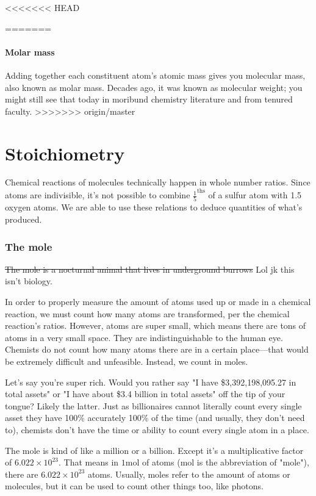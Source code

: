 \documentclass[letterpaper, 12pt]{article}
\begin{document}
<<<<<<< HEAD
	
	
=======

	\subsection{Molar mass}
	Adding together each constituent atom's atomic mass gives you molecular mass, also known as molar mass. Decades ago, it was known as molecular weight; you might still see that today in moribund chemistry literature and from tenured faculty.
>>>>>>> origin/master

\clearpage

\part{Stoichiometry}
Chemical reactions of molecules technically happen in whole number ratios. Since atoms are indivisible, it's not possible to combine $\frac{1}{5}^{\text{ths}}$ of a sulfur atom with 1.5 oxygen atoms. We are able to use these relations to deduce quantities of what's produced.

\section{The mole}
\st{The mole is a nocturnal animal that lives in underground burrows} Lol jk this isn't biology.

In order to properly measure the amount of atoms used up or made in a chemical reaction, we must count how many atoms are transformed, per the chemical reaction's ratios. However, atoms are super small, which means there are tons of atoms in a very small space. They are indistinguishable to the human eye. Chemists do not count how many atoms there are in a certain place---that would be extremely difficult and unfeasible. Instead, we count in moles.

Let's say you're super rich. Would you rather say "I have \$3,392,198,095.27 in total assets" or "I have about \$3.4 billion in total assets" off the tip of your tongue? Likely the latter. Just as billionaires cannot literally count every single asset they have 100\% accurately 100\% of the time (and usually, they don't need to), chemists don't have the time or ability to count every single atom in a place.

The mole is kind of like a million or a billion. Except it's a multiplicative factor of $6.022 \times 10^{23}$. That means in $1 \text{mol}$ of atoms (mol is the abbreviation of "mole"), there are $6.022 \times 10^{23}$ atoms. Usually, moles refer to the amount of atoms or molecules, but it can be used to count other things too, like photons.
\end{document}
